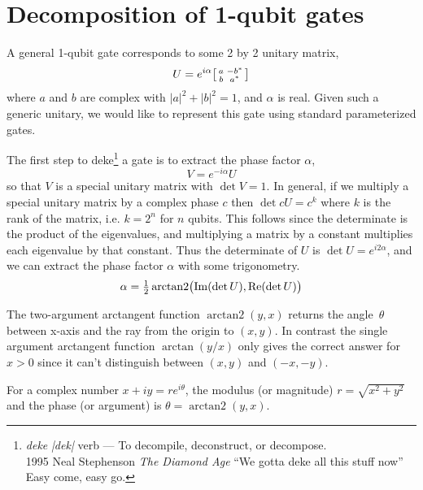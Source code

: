 


\clearpage
\section{Decomposition of 1-qubit gates}
A general 1-qubit gate corresponds to some 2 by 2 unitary matrix,
\[
U = 
e^{i\alpha}\begin{bsmallmatrix}
a & -b^* \\
b & a^*
\end{bsmallmatrix}\]
where $a$ and $b$ are complex with $|a|^2 + |b|^2 = 1$, and  $\alpha$ is real.
Given such a generic unitary, we would like to represent this gate using standard parameterized gates.   

The first step to deke\footnote{
{\sl deke} {\sl |dek|} verb --- To decompile, deconstruct, or decompose.
\\ 1995  Neal Stephenson {\sl The Diamond Age} ``We gotta deke all this stuff now'' Easy come, easy go.
} a gate is to extract the phase factor $\alpha$,
\[
V = e^{-i\alpha} U
\]
so that $V$ is a special unitary matrix with $\det V=1$. In general, if we multiply a special unitary matrix by a complex phase $c$ then $\det cU=c^k$ where $k$ is the rank of the matrix, i.e. $k=2^n$ for $n$ qubits. This follows since the determinate is the product of the eigenvalues, and multiplying a matrix by a constant multiplies each eigenvalue by that constant.
Thus the determinate of $U$ is $\det U=e^{i 2 \alpha }$, and we can extract the phase factor $\alpha$ with some trigonometry.
\[
\alpha = \tfrac{1}{2} \operatorname{arctan2}\bigl(\operatorname{Im}(\det U), \operatorname{Re}(\det U)\bigr)
\label{phase_extraction}
\]

The two-argument arctangent function $\operatorname{arctan2}(y,x)$ returns the angle~$\theta$ between x-axis and the ray from the origin to $(x, y)$. In contrast the single argument arctangent function $\arctan(y/x)$ only gives the correct answer for $x>0$ since it can't distinguish between $(x,y)$ and $(-x, -y)$.
\begin{center}
\end{center}
For a complex number $x+iy = r e^{i\theta}$, the modulus (or magnitude) $r=\sqrt{x^2+y^2}$ and the phase (or argument) is $\theta = \operatorname{arctan2}(y,x)$. 

